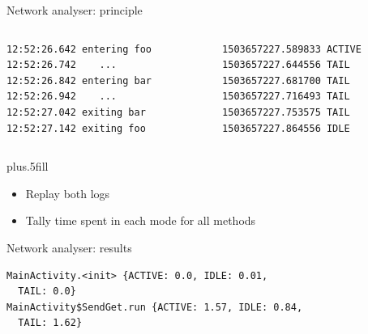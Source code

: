 \begin{frame}[fragile]{Network analyser: principle}
\begin{columns}
\begin{column}{0.5\textwidth}
\begin{lstlisting}
12:52:26.642 entering foo
12:52:26.742 	...
12:52:26.842 entering bar
12:52:26.942 	...
12:52:27.042 exiting bar
12:52:27.142 exiting foo
\end{lstlisting}
\end{column}
\begin{column}{0.5\textwidth}
\begin{lstlisting}
1503657227.589833 ACTIVE
1503657227.644556 TAIL
1503657227.681700 TAIL
1503657227.716493 TAIL
1503657227.753575 TAIL
1503657227.864556 IDLE
\end{lstlisting}
\end{column}
\end{columns}
\vskip0pt plus.5fill
\begin{itemize}
\item Replay both logs
\item Tally time spent in each mode for all methods
\end{itemize}
\end{frame}
%
%
\begin{frame}[fragile]{Network analyser: results}
\begin{lstlisting}
MainActivity.<init> {ACTIVE: 0.0, IDLE: 0.01,
  TAIL: 0.0}
MainActivity$SendGet.run {ACTIVE: 1.57, IDLE: 0.84,
  TAIL: 1.62}
\end{lstlisting}
\end{frame}
%
%

